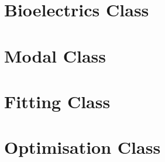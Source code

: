 \section{Bioelectrics Class}
\clearpage
%
\clearpage
%
%

\section{Modal Class}
\clearpage

\section{Fitting Class}
\clearpage
%

\section{Optimisation Class}
\clearpage
